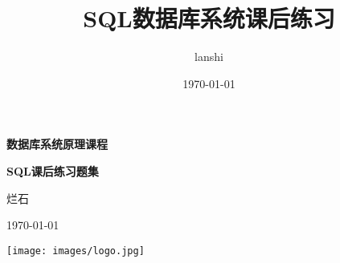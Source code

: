\documentclass[a4paper,12pt,UTF8,fontset=none]{ctexart}
\title{SQL数据库系统课后练习}
\author{lanshi}
\date{\today}
\begin{document}
\begin{titlepage}
    \centering
    \vspace*{\fill}
    {\LARGE\bfseries 数据库系统原理课程\par}
    \vspace{2cm}
    {\Huge\bfseries SQL课后练习题集\par}
    \vspace{2cm}
    {\Large 烂石\par}
    \vspace{1cm}
    {\large \today \par}
    \vspace{4cm}
    \texttt{[image: images/logo.jpg]}
    \vspace*{\fill}
    \thispagestyle{empty} %
    \newpage
\end{titlepage}

\end{document}
